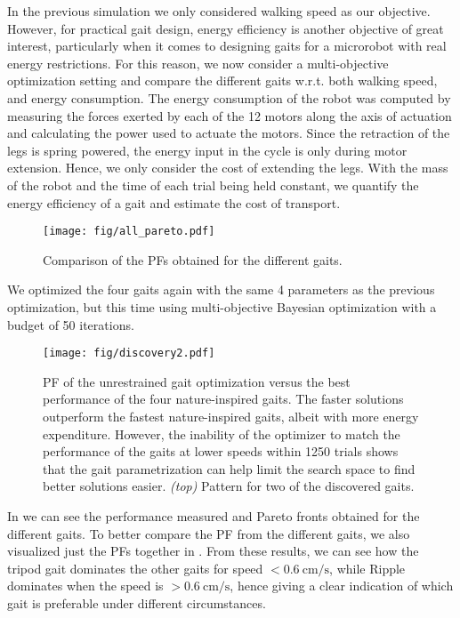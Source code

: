	In the previous simulation we only considered walking speed as our objective. 
	However, for practical gait design, energy efficiency is another objective of great interest, particularly when it comes to designing gaits for a microrobot with real energy restrictions. 
	For this reason, we now consider a multi-objective optimization setting and compare the different gaits w.r.t. both walking speed, and energy consumption.
	The energy consumption of the robot was computed by measuring the forces exerted by each of the 12 motors along the axis of actuation and calculating the power used to actuate the motors. 
	Since the retraction of the legs is spring powered, the energy input in the cycle is only during motor extension.
	Hence, we only consider the cost of extending the legs.
	With the mass of the robot and the time of each trial being held constant, we quantify the energy efficiency of a gait and estimate the cost of transport.
   
	\begin{wrapfigure}{r}{0.52\linewidth} 
	\vspace{-12pt}
	  \centering
	  \texttt{[image: fig/all\_pareto.pdf]}
	  \caption{Comparison of the PFs obtained for the different gaits.}
	  \label{fig:moo:all}
	  \vspace{-10pt}
	\end{wrapfigure}
	We optimized the four gaits again with the same 4 parameters as the previous optimization, but this time using multi-objective Bayesian optimization with a budget of 50 iterations.
	\begin{figure}[t]
	  \centering
	  \texttt{[image: fig/discovery2.pdf]}
	  \caption{PF of the unrestrained gait optimization versus the best performance of the four nature-inspired gaits. The faster solutions outperform the fastest nature-inspired gaits, albeit with more energy expenditure. However, the inability of the optimizer to match the performance of the gaits at lower speeds within 1250 trials shows that the gait parametrization can help limit the search space to find better solutions easier. \textit{(top)} Pattern for two of the discovered gaits.}
	  \label{fig:moo:new}
	\end{figure}
	In  we can see the performance measured and Pareto fronts obtained for the different gaits.
	To better compare the PF from the different gaits, we also visualized just  the PFs together in . 
	From these results, we can see how the tripod gait dominates the other gaits for speed $<\SI[per-mode=symbol]{0.6}{\centi\meter\per\second}$, while Ripple dominates when the speed is $>\SI[per-mode=symbol]{0.6}{\centi\meter\per\second}$, hence giving a clear indication of which gait is preferable under different circumstances. 
    

